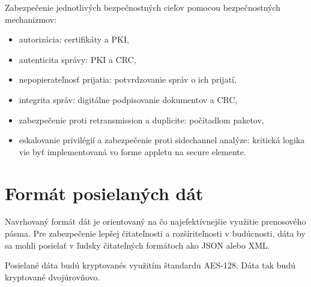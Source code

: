 \documentclass[12pt,a4paper,oneside,openright]{report}
\begin{document}
Zabezpečenie jednotlivých bezpečnostných cieľov pomocou bezpečnostných mechanizmov:
\singlespacing
\begin{itemize}
	\item autorizácia: certifikáty a PKI,
	\item autenticita správy: PKI a CRC,
	\item nepopierateľnosť prijatia: potvrdzovanie správ o ich prijatí,
	\item integrita správ: digitálne podpisovanie dokumentov a CRC,
	\item zabezpečenie proti retransmission a duplicite: počítadlom paketov,
	\item eskalovanie privilégií a zabezpečenie proti sidechannel analýze: kritická logika vie byť implementovaná vo forme appletu na secure elemente.
\end{itemize}
\onehalfspacing


\section{Formát posielaných dát}
Navrhovaný formát dát je orientovaný na čo najefektívnejšie využitie prenosového pásma. 
Pre zabezpečenie lepšej čitateľnosti a rozšíriteľnosti v budúcnosti, dáta by sa mohli posielať v ľudsky čitateľných formátoch ako JSON alebo XML.

Posielané dáta budú kryptovanés využitím štandardu AES-128. Dáta tak budú kryptované dvojúrovňovo.
\end{document}
